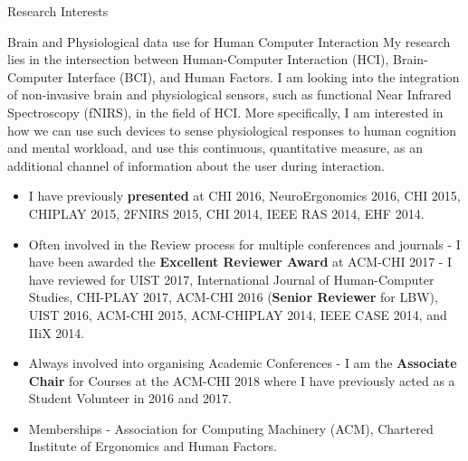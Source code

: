 \documentclass{resume} %
\begin{document}
\begin{rSection}{Research Interests}
\begin{rSubsection}{Brain and Physiological data use for Human Computer Interaction}{ }{ }{ }
\vspace{-5 mm}
My research lies in the intersection between Human-Computer Interaction (HCI), Brain-Computer Interface (BCI), and Human Factors. I am looking into the integration of non-invasive brain and physiological sensors, such as functional Near Infrared Spectroscopy (fNIRS), in the field of HCI. More specifically, I am interested in how we can use such devices to sense physiological responses to human cognition and mental workload, and use this continuous, quantitative measure, as an additional channel of information about the user during interaction.


\begin{itemize}
	\item I have previously \textbf{presented} at CHI 2016, NeuroErgonomics 2016, CHI 2015, CHIPLAY 2015, 2FNIRS 2015, CHI 2014, IEEE RAS 2014, EHF 2014.
	\vspace{-2mm}
	\item Often involved in the Review process for multiple conferences and journals - I have been awarded the \textbf{Excellent Reviewer Award} at ACM-CHI 2017 - I have reviewed for UIST 2017, International Journal of Human-Computer Studies, CHI-PLAY 2017, ACM-CHI 2016 (\textbf{Senior Reviewer} for LBW), UIST 2016, ACM-CHI 2015, ACM-CHIPLAY 2014, IEEE CASE 2014, and IIiX 2014.
	\vspace{-2mm}
	\item Always involved into organising Academic Conferences - I am the \textbf{Associate Chair} for Courses at the ACM-CHI 2018 where I have previously acted as a Student Volunteer in 2016 and 2017.
	\vspace{-2mm}
	\item  Memberships - Association for Computing Machinery (ACM), Chartered Institute of Ergonomics and Human Factors.
\end{itemize}

\end{rSubsection}

\end{rSection}
	\vspace{-3mm}
\end{document}
